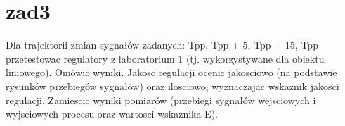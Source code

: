 \section{zad3}
\label{lab:zad3}

Dla trajektorii zmian sygnałów zadanych: Tpp, Tpp + 5, Tpp + 15, Tpp przetestowac
regulatory z laboratorium 1 (tj. wykorzystywane dla obiektu liniowego). Omówic wyniki.
Jakosc regulacji ocenic jakosciowo (na podstawie rysunków przebiegów sygnałów)
oraz ilosciowo, wyznaczajac wskaznik jakosci regulacji. Zamiescic wyniki pomiarów
(przebiegi sygnałów wejsciowych i wyjsciowych procesu oraz wartosci wskaznika E).

%    



\newpage
